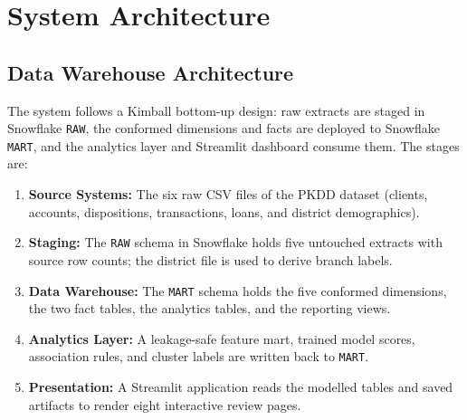 \chapter{System Architecture}
\section{Data Warehouse Architecture}
The system follows a Kimball bottom-up design: raw extracts are staged in Snowflake \texttt{RAW}, the conformed dimensions and facts are deployed to Snowflake \texttt{MART}, and the analytics layer and Streamlit dashboard consume them. The stages are:

\begin{enumerate}
    \item \textbf{Source Systems:} The six raw CSV files of the PKDD dataset (clients, accounts, dispositions, transactions, loans, and district demographics).
    \item \textbf{Staging:} The \texttt{RAW} schema in Snowflake holds five untouched extracts with source row counts; the district file is used to derive branch labels.
    \item \textbf{Data Warehouse:} The \texttt{MART} schema holds the five conformed dimensions, the two fact tables, the analytics tables, and the reporting views.
    \item \textbf{Analytics Layer:} A leakage-safe feature mart, trained model scores, association rules, and cluster labels are written back to \texttt{MART}.
    \item \textbf{Presentation:} A Streamlit application reads the modelled tables and saved artifacts to render eight interactive review pages.
\end{enumerate}

